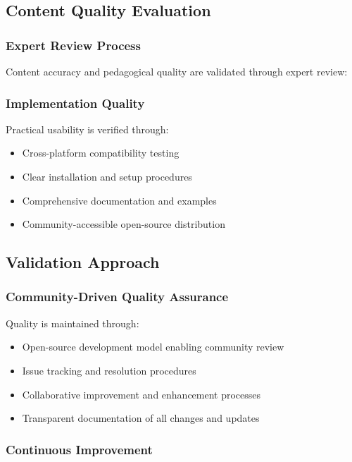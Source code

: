 \subsection{Content Quality Evaluation}

\subsubsection{Expert Review Process}

Content accuracy and pedagogical quality are validated through expert review:

\subsubsection{Implementation Quality}

Practical usability is verified through:

\begin{itemize}
    \item Cross-platform compatibility testing
    \item Clear installation and setup procedures
    \item Comprehensive documentation and examples
    \item Community-accessible open-source distribution
\end{itemize}

\subsection{Validation Approach}

\subsubsection{Community-Driven Quality Assurance}

Quality is maintained through:

\begin{itemize}
    \item Open-source development model enabling community review
    \item Issue tracking and resolution procedures
    \item Collaborative improvement and enhancement processes
    \item Transparent documentation of all changes and updates
\end{itemize}

\subsubsection{Continuous Improvement}

